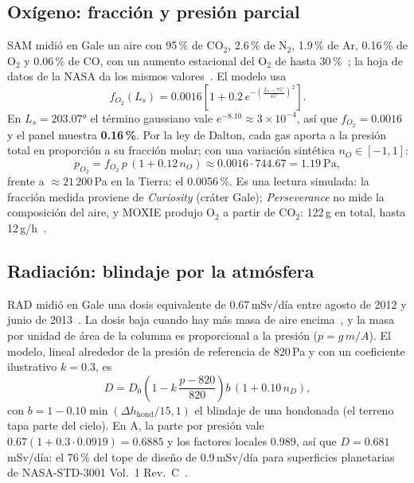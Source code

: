 \documentclass[conference]{IEEEtran}
\begin{document}
\subsection{Oxígeno: fracción y presión parcial}
SAM midió en Gale un aire con 95\,\% de CO$_2$, 2.6\,\% de N$_2$, 1.9\,\% de Ar, 0.16\,\% de O$_2$ y 0.06\,\% de CO, con un aumento estacional del O$_2$ de hasta 30\,\%~\cite{trainer2019,nasa_sam2019}; la hoja de datos de la NASA da los mismos valores~\cite{nasa_factsheet}. El modelo usa
\begin{equation}
f_{O_2}(L_s) = 0.0016\left[1 + 0.2\,e^{-\left(\frac{L_s-75°}{45°}\right)^2}\right].
\end{equation}
En $L_s = 203.07°$ el término gaussiano vale $e^{-8.10} \approx 3\times10^{-4}$, así que $f_{O_2} = 0.0016$ y el panel muestra \textbf{0.16\,\%}. Por la ley de Dalton, cada gas aporta a la presión total en proporción a su fracción molar; con una variación sintética $n_O\in[-1,1]$:
\begin{equation}
p_{O_2} = f_{O_2}\, p\,(1 + 0.12\,n_O) \approx 0.0016 \cdot 744.67 = \mathbf{1.19}\ \text{Pa},
\end{equation}
frente a $\approx 21\,200$\,Pa en la Tierra: el 0.0056\,\%. Es una lectura simulada: la fracción medida proviene de \emph{Curiosity} (cráter Gale); \emph{Perseverance} no mide la composición del aire, y MOXIE produjo O$_2$ a partir de CO$_2$: 122\,g en total, hasta 12\,g/h~\cite{nasa_instrumentos}.

\subsection{Radiación: blindaje por la atmósfera}
RAD midió en Gale una dosis equivalente de 0.67\,mSv/día entre agosto de 2012 y junio de 2013~\cite{hassler2014,nasa_rad2013}. La dosis baja cuando hay más masa de aire encima~\cite{guo2017}, y la masa por unidad de área de la columna es proporcional a la presión ($p = g\,m/A$). El modelo, lineal alrededor de la presión de referencia de 820\,Pa y con un coeficiente ilustrativo $k = 0.3$, es
\begin{equation}
D = D_0\left(1 - k\,\frac{p-820}{820}\right) b\,(1 + 0.10\,n_D),
\end{equation}
con $b = 1 - 0.10\min(\Delta h_{\text{hond}}/15, 1)$ el blindaje de una hondonada (el terreno tapa parte del cielo). En A, la parte por presión vale $0.67(1 + 0.3\cdot0.0919) = 0.6885$ y los factores locales 0.989, así que $D = \mathbf{0.681}$\,mSv/día: el 76\,\% del tope de diseño de 0.9\,mSv/día para superficies planetarias de NASA-STD-3001 Vol.~1 Rev.~C~\cite{nasa_ochmo2025}.
\end{document}
